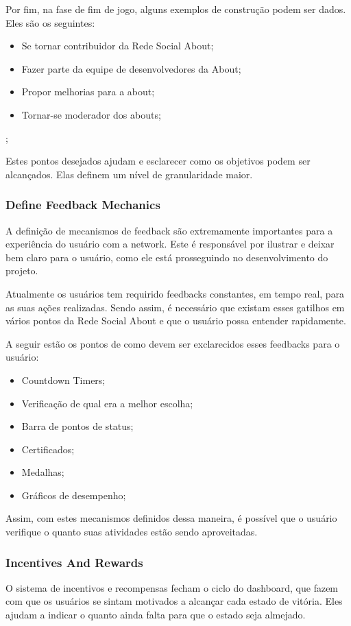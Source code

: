Por fim, na fase de fim de jogo, alguns exemplos de construção podem ser dados. Eles são os seguintes:
\begin{itemize}
    \item Se tornar contribuidor da Rede Social About;
    \item Fazer parte da equipe de desenvolvedores da About;
    \item Propor melhorias para a about;
    \item Tornar-se moderador dos abouts;
\end{itemize};

Estes pontos desejados ajudam e esclarecer como os objetivos podem ser alcançados. Elas 
definem um nível de granularidade maior.

\subsubsection{Define Feedback Mechanics}
\label{sub:define_feedback_mechanics}
A definição de mecanismos de feedback são extremamente importantes para a experiência 
do usuário
com a network. Este é responsável por ilustrar e deixar bem claro para o usuário, como 
ele está prosseguindo no desenvolvimento do projeto.

Atualmente os usuários tem requirido feedbacks constantes, em tempo real, para as suas 
ações
realizadas. Sendo assim, é necessário que existam esses gatilhos em vários pontos da
Rede Social About e que o usuário possa entender rapidamente.

A seguir estão os pontos  de como devem ser exclarecidos esses feedbacks para o 
usuário:

\begin{itemize}
    \item Countdown Timers;
    \item Verificação de qual era a melhor escolha;
    \item Barra de pontos de status;
    \item Certificados;
    \item Medalhas;
    \item Gráficos de desempenho;
\end{itemize}

Assim, com estes mecanismos definidos dessa maneira, é possível que o usuário verifique 
o quanto suas atividades estão sendo aproveitadas.

\subsubsection{Incentives And Rewards}
\label{sub:incentives_and_rewards}
O sistema de incentivos e recompensas fecham o ciclo do dashboard, que fazem com que 
os usuários se sintam motivados a alcançar cada estado de vitória. Eles ajudam a indicar
o quanto ainda falta para que o estado seja almejado.

